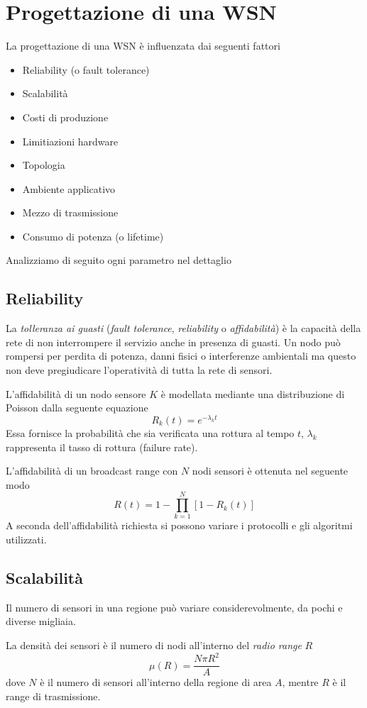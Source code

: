 \section{Progettazione di una WSN}

	La progettazione di una WSN è influenzata dai seguenti fattori
	\begin{itemize}
		\item Reliability (o fault tolerance)
		\item Scalabilità
		\item Costi di produzione
		\item Limitiazioni hardware
		\item Topologia
		\item Ambiente applicativo
		\item Mezzo di trasmissione
		\item Consumo di potenza (o lifetime)
	\end{itemize}
	Analizziamo di seguito ogni parametro nel dettaglio
	
\subsection{Reliability}
	La \emph{tolleranza ai guasti} (\emph{fault tolerance}, \emph{reliability} o \emph{affidabilità}) è la capacità della rete di non interrompere il servizio anche in presenza di guasti.
	Un nodo può rompersi per perdita di potenza, danni fisici o interferenze ambientali ma questo non deve pregiudicare l'operatività di tutta la rete di sensori.
	
	L'affidabilità di un nodo sensore $K$ è modellata mediante una distribuzione di Poisson dalla seguente equazione
	\[ R_k(t) = e^{-\lambda_k t} \] 
	Essa fornisce la probabilità che sia verificata una rottura al tempo $t$,
	$\lambda_k$ rappresenta il tasso di rottura (failure rate).
	
	L'affidabilità di un broadcast range con $N$ nodi sensori è ottenuta nel seguente modo
	\[ R(t) = 1 - \prod_{k=1}^{N} [1 - R_k(t)] \]
	A seconda dell'affidabilità richiesta si possono variare i protocolli e gli algoritmi utilizzati.
	
\subsection{Scalabilità}
	Il numero di sensori in una regione può variare considerevolmente, da pochi e diverse migliaia.
	
	La densità dei sensori è il numero di nodi all'interno del \emph{radio range} $R$
	\[ \mu(R) = \frac{N \pi R^2}{A} \]
	dove $N$ è il numero di sensori all'interno della regione di area $A$, mentre $R$ è il range di trasmissione.

